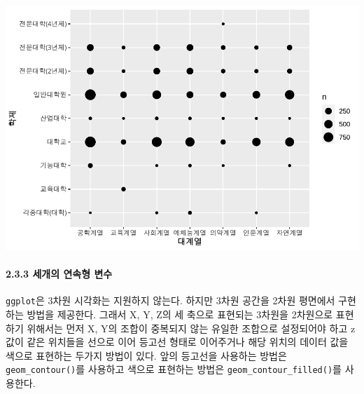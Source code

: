 \documentclass[
]{article}
\begin{document}
\includegraphics{chap3_files/figure-latex/unnamed-chunk-42-1.pdf}

\hypertarget{uxc138uxac1cuxc758-uxc5f0uxc18duxd615-uxbcc0uxc218}{%
\paragraph{2.3.3 세개의 연속형 변수}\label{uxc138uxac1cuxc758-uxc5f0uxc18duxd615-uxbcc0uxc218}}

\texttt{ggplot}은 3차원 시각화는 지원하지 않는다. 하지만 3차원 공간을 2차원 평면에서 구현하는 방법을 제공한다. 그래서 X, Y, Z의 세 축으로 표현되는 3차원을 2차원으로 표현하기 위해서는 먼저 X, Y의 조합이 중복되지 않는 유일한 조합으로 설정되어야 하고 z값이 같은 위치들을 선으로 이어 등고선 형태로 이어주거나 해당 위치의 데이터 값을 색으로 표현하는 두가지 방법이 있다. 앞의 등고선을 사용하는 방법은 \texttt{geom\_contour()}를 사용하고 색으로 표현하는 방법은 \texttt{geom\_contour\_filled()}를 사용한다.
\end{document}

